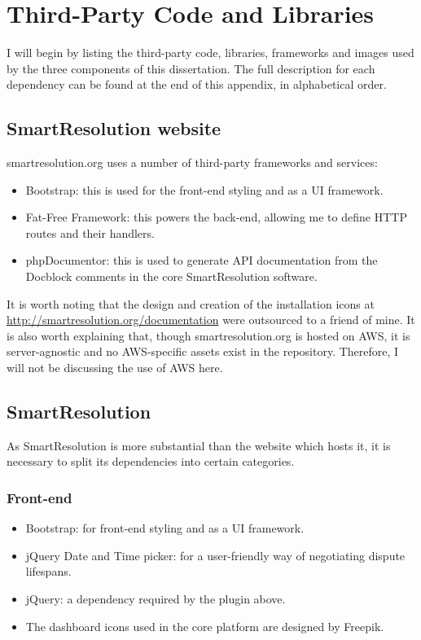 \chapter{Third-Party Code and Libraries}

I will begin by listing the third-party code, libraries, frameworks and images used by the three components of this dissertation. The full description for each dependency can be found at the end of this appendix, in alphabetical order.

\section{SmartResolution website}

smartresolution.org uses a number of third-party frameworks and services:

\begin{itemize}
\item Bootstrap: this is used for the front-end styling and as a UI framework.
\item Fat-Free Framework: this powers the back-end, allowing me to define HTTP routes and their handlers.
\item phpDocumentor: this is used to generate API documentation from the Docblock comments in the core SmartResolution software.
\end{itemize}

It is worth noting that the design and creation of the installation icons at \url{http://smartresolution.org/documentation} were outsourced to a friend of mine. It is also worth explaining that, though smartresolution.org is hosted on AWS, it is server-agnostic and no AWS-specific assets exist in the repository. Therefore, I will not be discussing the use of AWS here.

\section{SmartResolution}

As SmartResolution is more substantial than the website which hosts it, it is necessary to split its dependencies into certain categories.

\subsection{Front-end}

\begin{itemize}
\item Bootstrap: for front-end styling and as a UI framework.
\item jQuery Date and Time picker: for a user-friendly way of negotiating dispute lifespans.
\item jQuery: a dependency required by the plugin above.
\item The dashboard icons used in the core platform are designed by Freepik.
\end{itemize}

